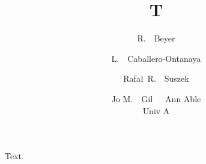 \documentclass{article}
\title{T}
\author{R.~~Beyer \and L.~~Caballero-Ontanaya \and \vspace{45pt}Rafa\l ~R.\ ~Suszek
\and Jo M.~~Gil~~~Ann Able \\ Univ A}
\begin{document}
\maketitle
Text.
\end{document}
